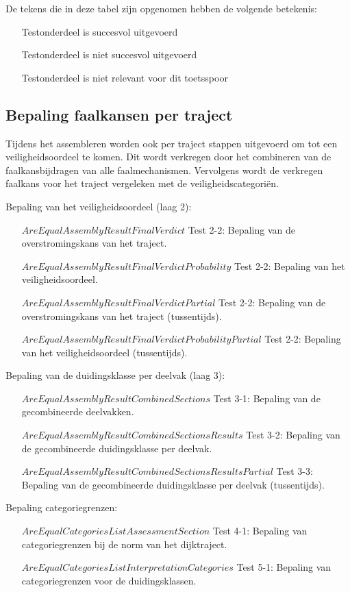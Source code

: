 De tekens die in deze tabel zijn opgenomen hebben de volgende betekenis:
\begin{itemize}
	\item [\cmark] Testonderdeel is succesvol uitgevoerd
	\item [\xmark] Testonderdeel is niet succesvol uitgevoerd
	\item [\nmark] Testonderdeel is niet relevant voor dit toetsspoor
\end{itemize}

\subsection{Bepaling faalkansen per traject}
	\label{sec:$Order$:pertraject}
Tijdens het assembleren worden ook per traject stappen uitgevoerd om tot een veiligheidsoordeel te komen. Dit wordt verkregen door het combineren van de faalkansbijdragen van alle faalmechanismen. Vervolgens wordt de verkregen faalkans voor het traject vergeleken met de veiligheidscategori\"en.

Bepaling van het veiligheidsoordeel (laag 2):
\begin{itemize}
	\item [$AreEqualAssemblyResultFinalVerdict$]Test 2-2: Bepaling van de overstromingskans van het traject.
	\item [$AreEqualAssemblyResultFinalVerdictProbability$]Test 2-2: Bepaling van het veiligheidsoordeel.
	\item [$AreEqualAssemblyResultFinalVerdictPartial$]Test 2-2: Bepaling van de overstromingskans van het traject (tussentijds).
	\item [$AreEqualAssemblyResultFinalVerdictProbabilityPartial$]Test 2-2: Bepaling van het veiligheidsoordeel (tussentijds).
\end{itemize}

Bepaling van de duidingsklasse per deelvak (laag 3):
\begin{itemize}
	\item [$AreEqualAssemblyResultCombinedSections$] Test 3-1: Bepaling van de gecombineerde deelvakken.
	\item [$AreEqualAssemblyResultCombinedSectionsResults$] Test 3-2: Bepaling van de gecombineerde duidingsklasse per deelvak.
	\item [$AreEqualAssemblyResultCombinedSectionsResultsPartial$] Test 3-3: Bepaling van de gecombineerde duidingsklasse per deelvak (tussentijds).
\end{itemize}

Bepaling categoriegrenzen:
\begin{itemize}
	\item [$AreEqualCategoriesListAssessmentSection$]Test 4-1: Bepaling van categoriegrenzen bij de norm van het dijktraject.
	\item [$AreEqualCategoriesListInterpretationCategories$]Test 5-1: Bepaling van categoriegrenzen voor de duidingsklassen.
\end{itemize}
